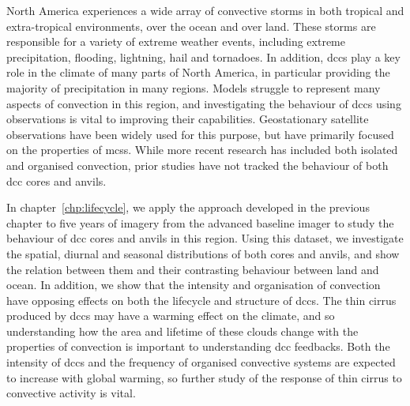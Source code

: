 
North America experiences a wide array of convective storms in both tropical and extra-tropical environments, over the ocean and over land. 
These storms are responsible for a variety of extreme weather events, including extreme precipitation, flooding, lightning, hail and tornadoes.
In addition, \acrshort{dcc}s play a key role in the climate of many parts of North America, in particular providing the majority of precipitation in many regions.
Models struggle to represent many aspects of convection in this region, and investigating the behaviour of \acrshort{dcc}s using observations is vital to improving their capabilities.
Geostationary satellite observations have been widely used for this purpose, but have primarily focused on the properties of \acrshort{mcs}s.
While more recent research has included both isolated and organised convection, prior studies have not tracked the behaviour of both \acrshort{dcc} cores and anvils.

In chapter~\ref{chp:lifecycle}, we apply the approach developed in the previous chapter to five years of imagery from the advanced baseline imager to study the behaviour of \acrshort{dcc} cores and anvils in this region. Using this dataset, we investigate the spatial, diurnal and seasonal distributions of both cores and anvils, and show the relation between them and their contrasting behaviour between land and ocean. In addition, we show that the intensity and organisation of convection have opposing effects on both the lifecycle and structure of \acrshort{dcc}s. The thin cirrus produced by \acrshort{dcc}s may have a warming effect on the climate, and so understanding how the area and lifetime of these clouds change with the properties of convection is important to understanding \acrshort{dcc} feedbacks. Both the intensity of \acrshort{dcc}s and the frequency of organised convective systems are expected to increase with global warming, so further study of the response of thin cirrus to convective activity is vital.


